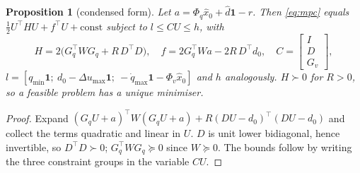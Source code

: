 \documentclass[11pt,a4paper]{article}
\newtheorem{proposition}[theorem]{Proposition}
\theoremstyle{remark}
\theoremstyle{definition}
\begin{document}
\begin{proposition}[condensed form]\label{prop:qp}
Let $a=\Phi_q\hat x_0+\hat d\mathbf 1-r$. Then \eqref{eq:mpc} equals $\tfrac12U^\top HU+f^\top U+\mathrm{const}$ subject to $l\le CU\le h$, with
\begin{equation}\label{eq:H}
H=2\big(G_q^\top WG_q+R\,D^\top D\big),\quad f=2G_q^\top Wa-2R\,D^\top d_0,\quad C=\begin{bmatrix}I\\D\\G_v\end{bmatrix},
\end{equation}
$l=[q_{\min}\mathbf1;\ d_0-\Delta u_{\max}\mathbf1;\ -\dot q_{\max}\mathbf1-\Phi_v\hat x_0]$ and $h$ analogously. $H\succ0$ for $R>0$, so a feasible problem has a unique minimiser.
\end{proposition}
\begin{proof}
Expand $(G_qU+a)^\top W(G_qU+a)+R(DU-d_0)^\top(DU-d_0)$ and collect the terms quadratic and linear in $U$. $D$ is unit lower bidiagonal, hence invertible, so $D^\top D\succ0$;
$G_q^\top WG_q\succeq0$ since $W\succeq0$. The bounds follow by writing the three constraint groups in the variable $CU$.
\end{proof}
\end{document}
